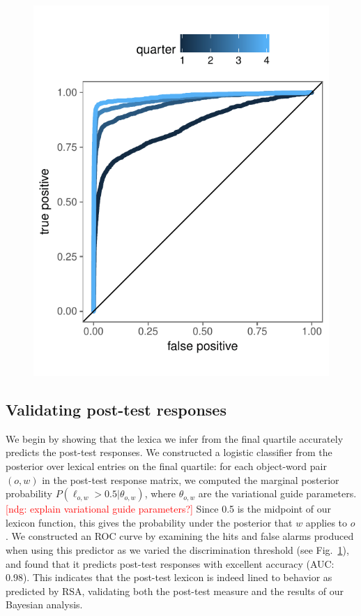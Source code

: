 \documentclass[10pt,letterpaper]{article}
\newcommand{\mf}[1]{\textcolor{Red}{[ndg: #1]}}
\begin{document}
\begin{figure}[t]
\begin{center}
{\includegraphics[scale=0.7]{modelPerformance.pdf}}
{\caption{{\footnotesize {}  \label{fig:postTestPrediction}}}}
\end{center}
\end{figure}

\subsection{Validating post-test responses}

We begin by showing that the lexica we infer from the final quartile accurately predicts the post-test responses. 
We constructed a logistic classifier from the posterior over lexical entries on the final quartile: for each object-word pair $(o,w)$ in the post-test response matrix, we computed the marginal posterior probability $P(\ell_{o,w} > 0.5| \theta_{o,w})$, where $\theta_{o,w}$ are the variational guide parameters. \mf{explain variational guide parameters?} Since 0.5 is the midpoint of our lexicon function, this gives the probability under the posterior that $w$ applies to $o$. We constructed an ROC curve by examining the hits and false alarms produced when using this predictor as we varied the discrimination threshold (see Fig.\ \ref{fig:postTestPrediction}), and found that it predicts post-test responses with excellent accuracy (AUC: 0.98). This indicates that the post-test lexicon is indeed lined to behavior as predicted by RSA, validating both the post-test measure and the results of our Bayesian analysis.
\end{document}
